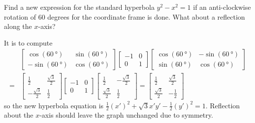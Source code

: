 \begin{Exercise}
Find a new expression for the standard hyperbola $y^2 - x^2 = 1$ if an anti-clockwise rotation of $60$ degrees for the coordinate frame is done. What about a reflection along the $x$-axis?
\end{Exercise}
\begin{Answer}
It is to compute
\begin{align*}
& \begin{bmatrix}
\cos (\SI{60}{\degree}) & \sin (\SI{60}{\degree}) \\
-\sin (\SI{60}{\degree}) & \cos (\SI{60}{\degree})
\end{bmatrix}
\begin{bmatrix}
-1 & 0 \\
0 & 1
\end{bmatrix}
\begin{bmatrix}
\cos (\SI{60}{\degree}) & -\sin (\SI{60}{\degree}) \\
\sin (\SI{60}{\degree}) & \cos (\SI{60}{\degree})
\end{bmatrix} \\
=& \begin{bmatrix}
\frac{1}{2} & \frac{\sqrt{3}}{2} \\
-\frac{\sqrt{3}}{2}  & \frac{1}{2}
\end{bmatrix}
\begin{bmatrix}
-1 & 0 \\
0 & 1
\end{bmatrix}
\begin{bmatrix}
\frac{1}{2} & -\frac{\sqrt{3}}{2}  \\
\frac{\sqrt{3}}{2}  & \frac{1}{2}
\end{bmatrix}
=
\begin{bmatrix}
\frac{1}{2}&\frac{\sqrt{3}}{2}\\ 
\frac{\sqrt{3}}{2}&-\frac{1}{2}
\end{bmatrix}
\end{align*}
so the new hyperbola equation is $\frac{1}{2}(x')^2+ \sqrt{3}x'y' -\frac{1}{2}(y')^2 = 1$. Reflection about the $x$-axis should leave the graph unchanged due to symmetry.
\end{Answer}

